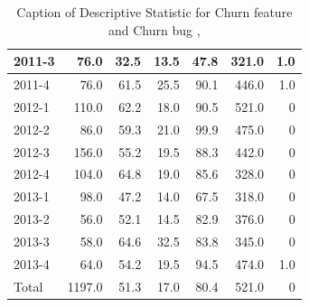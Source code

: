\documentclass[UKenglish]{ifimaster}  %
\begin{document}
\begin{table}[!htbp]
\begin{adjustwidth}{-1.5cm}{}
{{\begin{tabular}{ | l | r | r | r | r | r | r | }
2011-3 & 76.0 & 32.5 & 13.5 & 47.8 & 321.0 & 1.0\\ \hline
2011-4 & 76.0 & 61.5 & 25.5 & 90.1 & 446.0 & 1.0\\ \hline
2012-1 & 110.0 & 62.2 & 18.0 & 90.5 & 521.0 & 0\\ \hline
2012-2 & 86.0 & 59.3 & 21.0 & 99.9 & 475.0 & 0\\ \hline
2012-3 & 156.0 & 55.2 & 19.5 & 88.3 & 442.0 & 0\\ \hline
2012-4 & 104.0 & 64.8 & 19.0 & 85.6 & 328.0 & 0\\ \hline
2013-1 & 98.0 & 47.2 & 14.0 & 67.5 & 318.0 & 0\\ \hline
2013-2 & 56.0 & 52.1 & 14.5 & 82.9 & 376.0 & 0\\ \hline
2013-3 & 58.0 & 64.6 & 32.5 & 83.8 & 345.0 & 0\\ \hline
2013-4 & 64.0 & 54.2 & 19.5 & 94.5 & 474.0 & 1.0\\ \hline
Total & 1197.0 & 51.3 & 17.0 & 80.4 & 521.0 & 0\\ \hline
\end{tabular}
}
}
\end{adjustwidth}
\caption[Optional caption for list of figures]{Caption of Descriptive Statistic for Churn feature and Churn bug , }
\label{DS:2:4}
\end{table}
\end{document}
